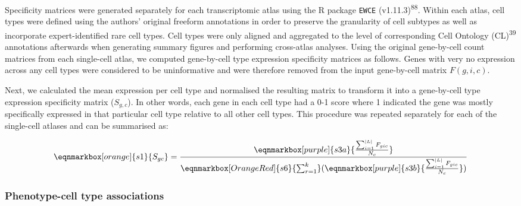 \documentclass[
]{article}
\begin{document}
Specificity matrices were generated separately for each transcriptomic
atlas using the R package \texttt{EWCE} (v1.11.3)\textsuperscript{88}.
Within each atlas, cell types were defined using the authors' original
freeform annotations in order to preserve the granularity of cell
subtypes as well as incorporate expert-identified rare cell types. Cell
types were only aligned and aggregated to the level of corresponding
Cell Ontology (CL)\textsuperscript{39} annotations afterwards when
generating summary figures and performing cross-atlas analyses. Using
the original gene-by-cell count matrices from each single-cell atlas, we
computed gene-by-cell type expression specificity matrices as follows.
Genes with very no expression across any cell types were considered to
be uninformative and were therefore removed from the input gene-by-cell
matrix \(F(g,i,c)\).

Next, we calculated the mean expression per cell type and normalised the
resulting matrix to transform it into a gene-by-cell type expression
specificity matrix (\(S_{g,c}\)). In other words, each gene in each cell
type had a 0-1 score where 1 indicated the gene was mostly specifically
expressed in that particular cell type relative to all other cell types.
This procedure was repeated separately for each of the single-cell
atlases and can be summarised as:

\hfill\break

\begin{equation*}
  \eqnmarkbox[orange]{s1}{S_{gc}}
  =
  \frac{
    \eqnmarkbox[purple]{s3a}{
      \frac{
        \sum_{i=1}^{|L|} F_{gic}
      }{
        N_c  
      }
    } 
  }{
   \eqnmarkbox[OrangeRed]{s6}{\sum_{r=1}^{k}}(
     \eqnmarkbox[purple]{s3b}{
      \frac{
        \sum_{i=1}^{|L|} F_{gic}
      }{
        N_c  
      }
    } 
   ) 
  }
\end{equation*}

\hfill\break

\subsubsection{Phenotype-cell type
associations}\label{phenotype-cell-type-associations-1}
\end{document}
